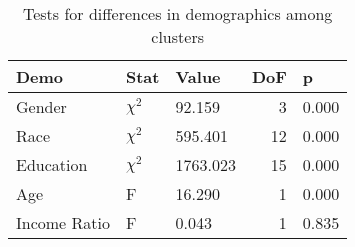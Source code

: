 \begin{table}[h]
\caption{Tests for differences in demographics among clusters}
\label{tab:cluster_demo_tests}
\begin{tabular}{lllrl}
\toprule
Demo & Stat & Value & DoF & p \\
\midrule
Gender & \(\chi^2\) & 92.159 & 3 & 0.000 \\
Race & \(\chi^2\) & 595.401 & 12 & 0.000 \\
Education & \(\chi^2\) & 1763.023 & 15 & 0.000 \\
Age & F & 16.290 & 1 & 0.000 \\
Income Ratio & F & 0.043 & 1 & 0.835 \\
\bottomrule
\end{tabular}
\end{table}
